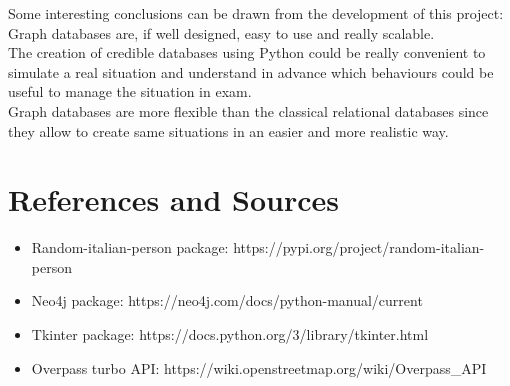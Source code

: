 \documentclass{article}
\begin{document}
Some interesting conclusions can be drawn from the development of this project: Graph databases are, if well designed, easy to use and really scalable. \\
The creation of credible databases using Python could be really convenient to simulate a real situation and understand in advance which behaviours could be useful to manage the situation in exam.\\
Graph databases are more flexible than the classical relational databases since they allow to create same situations in an easier and more realistic way.

\section{References and Sources}
\begin{itemize}
    \item Random-italian-person package: https://pypi.org/project/random-italian-person
    \item Neo4j package: https://neo4j.com/docs/python-manual/current
    \item Tkinter package: https://docs.python.org/3/library/tkinter.html
    \item Overpass turbo API: https://wiki.openstreetmap.org/wiki/Overpass\_API
\end{itemize}
\end{document}
